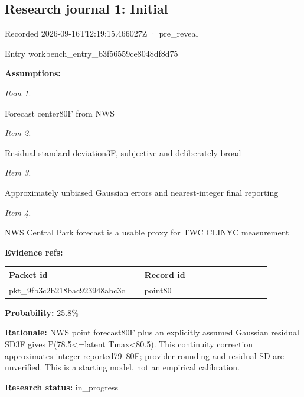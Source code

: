 \documentclass[11pt]{article}
\begin{document}
\subsection*{\textcolor{epdarkgreen}{Research journal 1: Initial}}
Recorded 2026-09-16T12:19:15.466027Z · pre\_reveal


Entry workbench\_en\hspace{0pt}try\_b3f56559\hspace{0pt}ce8048df8d75


\par\noindent\textbf{Assumptions:} \par \par\noindent\textit{Item 1.}\par Forecast center80F from NWS

\par\noindent\textit{Item 2.}\par Residual standard deviation3F, subjective and deliberately broad

\par\noindent\textit{Item 3.}\par Approximately unbiased Gaussian errors and nearest-integer final reporting

\par\noindent\textit{Item 4.}\par NWS Central Park forecast is a usable proxy for TWC CLINYC measurement

\par\noindent\textbf{Evidence refs:} \par \begin{longtable}{>{\raggedright\arraybackslash}p{0.440\linewidth}>{\raggedright\arraybackslash}p{0.440\linewidth}}
Packet id & Record id \\ \hline\endhead
pkt\_9fb3c2b218bac923948abc3c & point80 \\
\end{longtable}

\par\noindent\textbf{Probability:} 25.8\%

\par\noindent\textbf{Rationale:} NWS point forecast80F plus an explicitly assumed Gaussian residual SD3F gives P(78.5<=latent Tmax<80.5). This continuity correction approximates integer reported79–80F; provider rounding and residual SD are unverified. This is a starting model, not an empirical calibration.

\par\noindent\textbf{Research status:} in\_progress
\end{document}
